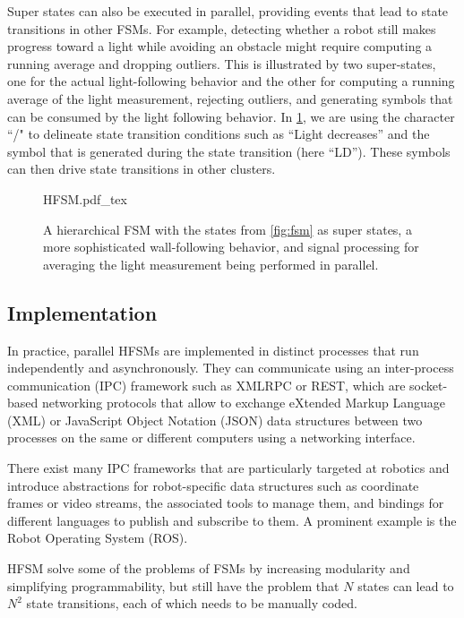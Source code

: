 Super states can also be executed in parallel, providing events that lead to state transitions in other FSMs. For example, detecting whether a robot still makes progress toward a light while avoiding an obstacle might require computing a running average and dropping outliers. This is illustrated by two super-states, one for the actual light-following behavior and the other for computing a running average of the light measurement, rejecting outliers, and generating symbols that can be consumed by the light following behavior. In \cref{fig:hfsm}, we are using the character ``/" to delineate state transition conditions such as ``Light decreases'' and the symbol that is generated during the state transition (here ``LD''). These symbols can then drive state transitions in other clusters.

\begin{figure}
\centering
    \tiny
    \def\svgwidth{1.0\textwidth}
    {HFSM.pdf_tex}
\caption{A hierarchical FSM with the states from \cref{fig:fsm} as super states, a more sophisticated wall-following behavior, and signal processing for averaging the light measurement being performed in parallel. \label{fig:hfsm}}
\end{figure}

\subsection{Implementation}
In practice, parallel HFSMs are implemented in distinct processes that run independently and asynchronously. They can communicate using an inter-process communication (IPC) framework  such as XMLRPC or REST, which are socket-based networking protocols that allow to exchange eXtended Markup Language (XML) or JavaScript Object Notation (JSON) data structures between two processes on the same or different computers using a networking interface.

There exist many IPC frameworks that are particularly targeted at robotics and introduce abstractions for robot-specific data structures such as coordinate frames or video streams, the associated tools to manage them, and bindings for different languages to publish and subscribe to them. A prominent example is the Robot Operating System (ROS).


HFSM solve some of the problems of FSMs by increasing modularity and simplifying programmability, but still have the problem that $N$ states can lead to $N^2$ state transitions, each of which needs to be manually coded.

